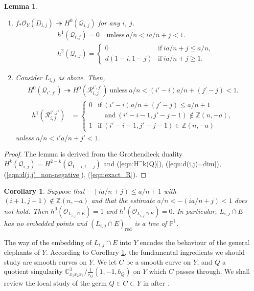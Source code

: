 \documentclass[a4paper,11pt]{amsart}
\newtheorem{lemma}[theorem]{Lemma}
\newtheorem{corollary}[theorem]{Corollary}
\theoremstyle{definition}
\theoremstyle{remark}
\numberwithin{equation}{section}
\newcommand{\bC}{{\mathbb C}}
\newcommand{\bP}{{\mathbb P}}
\newcommand{\bZ}{{\mathbb Z}}
\newcommand{\cO}{{\mathcal O}}
\newcommand{\cQ}{{\mathcal Q}}
\newcommand{\calR}{{\mathcal R}}
\newcommand{\red}{\mathrm{red}}
\begin{document}
\begin{lemma}\label{lem:QandR}
\begin{enumerate}
\item\label{itm:QandR_Q}
$f_*\cO_Y(D_{i,j}) \twoheadrightarrow H^0(\cQ_{i,j})$ for any $i$, $j$.
\begin{align*}
&h^1(\cQ_{i,j})=0 \quad
\textrm{unless} \ a/n<ia/n+j<1.\\
&h^2(\cQ_{i,j})=
\begin{cases}
0 & \textrm{if} \ ia/n+j \le a/n,\\
d(1-i,1-j) & \textrm{if} \ ia/n+j \ge 1.
\end{cases}
\end{align*}
\item\label{itm:QandR_R}
Consider $L_{i,j}$ as above.
Then,
\begin{align*}
H^0(\cQ_{i',j'}) \twoheadrightarrow H^0(\calR_{i,j}^{i',j'}) \
\textrm{unless} \ a/n<(i'-i)a/n+(j'-j)<1.
\end{align*}
\begin{align*}
h^1(\calR_{i,j}^{i',j'})&=
\begin{cases}
0 & \textrm{if} \ (i'-i)a/n+(j'-j) \le a/n+1 \\
  & \quad \textrm{and} \ (i'-i-1,j'-j-1)\not\in\bZ(n, -a),\\
1 & \textrm{if} \ (i'-i-1,j'-j-1)\in\bZ(n, -a)
\end{cases}
\end{align*}
unless $a/n<i'a/n+j'<1$.
\end{enumerate}
\end{lemma}

\begin{proof}
The lemma is derived from
the Grothendieck duality $H^k(\cQ_{i,j})=H^{2-k}(\cQ_{1-i,1-j})$
and (\ref{eqn:H^k(Q)}), (\ref{eqn:d(i,j)=dim}),
(\ref{eqn:d(i,j)_non-negative}), (\ref{eqn:exact_R}).
\end{proof}

\begin{corollary}\label{cor:P1}
Suppose that $-(ia/n+j)\le a/n+1$ with $(i+1,j+1)\not\in\bZ(n, -a)$
and that the estimate $a/n<-(ia/n+j)<1$ does not hold.
Then $h^0(\cO_{L_{i,j} \cap E})=1$ and $h^1(\cO_{L_{i,j} \cap E})=0$.
In particular,
$L_{i,j} \cap E$ has no embedded points and
$(L_{i,j} \cap E)_\red$ is a tree of $\bP^1$.
\end{corollary}

The way of the embedding of $L_{i,j} \cap E$ into $Y$ encodes
the behaviour of the general elephants of $Y$.
According to Corollary \ref{cor:P1},
the fundamental ingredients we should study are smooth curves on $Y$.
We let $C$ be a smooth curve on $Y$,
and $Q$ a quotient singularity $\bC^3_{x_1x_2x_3}/\frac{1}{r_Q}(1, -1, b_Q)$
on $Y$ which $C$ passes through.
We shall review the local study of the germ $Q \in C \subset Y$
in \cite[Section 2]{Ka03} after \cite[Section 2]{Mo88}.
\end{document}
